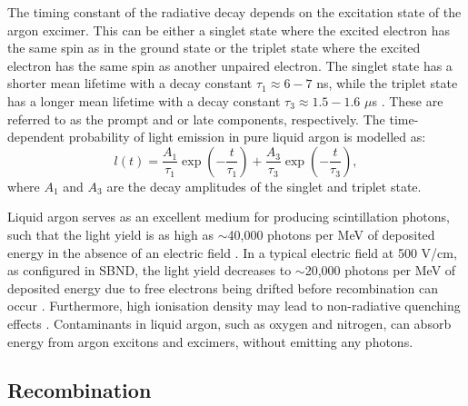 The timing constant of the radiative decay depends on the excitation state of the argon excimer.
This can be either a singlet state where the excited electron has the same spin as in the ground state or the triplet state where the excited electron has the same spin as another unpaired electron.
The singlet state has a shorter mean lifetime with a decay constant $\tau_{1} \approx 6 - 7$ ns, while the triplet state has a longer mean lifetime with a decay constant $\tau_{3} \approx 1.5 - 1.6$ 
$\mu$s \cite{photon_lifetime}.
These are referred to as the prompt and or late components, respectively. 
The time-dependent probability of light emission in pure liquid argon is modelled as:
\begin{equation}
        l(t)=\frac{A_{1}}{\tau_{1}}\exp{\left(-\frac{t}{\tau_{1}}\right)} +\frac{A_{3}}{\tau_{3}}\exp{\left(-\frac{t}{\tau_{3}}\right)},
\end{equation}
where $A_{1}$ and $A_{3}$ are the decay amplitudes of the singlet and triplet state.

Liquid argon serves as an excellent medium for producing scintillation photons, such that the light yield is as high as $\sim$40,000 photons per MeV of deposited energy in the absence of an electric field \cite{light_yield}.
In a typical electric field at 500 V/cm, as configured in SBND, the light yield decreases to $\sim$20,000 photons per MeV of deposited energy due to free electrons being drifted before recombination can occur \cite{light_yield_Efield}.
Furthermore, high ionisation density may lead to non-radiative quenching effects \cite{Lariat}.
Contaminants in liquid argon, such as oxygen and nitrogen, can absorb energy from argon excitons and excimers, without emitting any photons.
 
\subsection{Recombination}
\label{sec:recomb}

